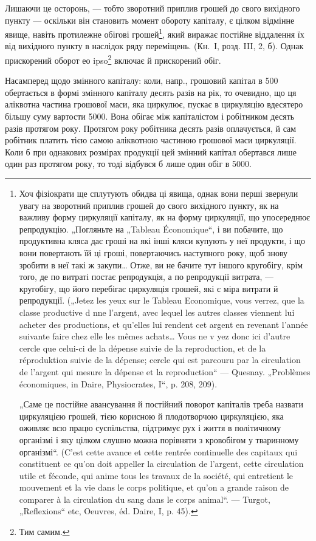 Лишаючи це осторонь,  — тобто зворотний приплив
грошей до свого вихідного пункту — оскільки він становить момент
обороту капіталу, є цілком відмінне явище, навіть протилежне обігові
грошей\footnote{
Хоч фізіократи ще сплутують обидва ці явища, однак вони перші звернули
увагу на зворотний приплив грошей до свого вихідного пункту, як на важливу
форму циркуляції капіталу, як на форму циркуляції, що упосереднює репродукцію.
„Погляньте на „Tableau Économique“, і ви побачите, що продуктивна кляса дає
гроші на які інші кляси купують у неї продукти, і що вони повертають їй ці
гроші, повертаючись наступного року, щоб знову зробити в неї такі ж закупи\dots{}
Отже, ви не бачите тут іншого кругобігу, крім того, де по витраті
постає репродукція, а по репродукції витрата, — кругобігу, що його перебігає
циркуляція грошей, які є міра витрати й репродукції. („Jetez les yeux sur le
Tableau Economique, vous verrez, que la classe productive d nne l’argent,
avec lequel les autres classes viennent lui acheter des productions, et qu’elles lui
rendent cet argent en revenant l’année suivante faire chez elle les mêmes achats\dots{}
Vous ne v yez donc ici d’autre cercle que celui-ci de la dépense suivie de la reproduction,
et de la réproduktion suivie de la dépense; cercle qui est parcouru par la
circulation de l’argent qui mesure la dépense et la reproduction“ — Quesnay. „Problèmes
économiques, in Daire, Physiocrates, I“, p. 208, 209).

„Саме це постійне авансування й постійний поворот капіталів треба назвати
циркуляцією грошей, тією корисною й плодотворчою циркуляцією, яка оживляє
всю працю суспільства, підтримує рух і життя в політичному організмі і яку
цілком слушно можна порівняти з кровобігом у тваринному організмі“. (C’est
cette avance et cette rentrée continuelle des capitaux qui constituent ce qu’on doit
appeller la circulation de l’argent, cette circulation utile et féconde, qui anime tous
les travaux de la société, qui entretient le mouvement et la vie dans le corps politique,
et qu’on a grande raison de comparer à la circulation du sang dans le corps animal“.
— Turgot, „Reflexions“ etc, Oeuvres, éd. Daire, I, p. 45).}, який виражає постійне віддалення їх від вихідного
пункту в наслідок ряду переміщень. (Кн.~І, розд. III, 2, б). Однак прискорений
оборот ео ipso\footnote*{
Тим самим. 
} включає й прискорений обіг.

Насамперед щодо змінного капіталу: коли, напр., грошовий капітал
в 500 обертається в формі змінного капіталу десять разів на
рік, то очевидно, що ця аліквотна частина грошової маси, яка циркулює,
пускає в циркуляцію вдесятеро більшу суму вартости \deq{} 5000.
Вона обігає між капіталістом і робітником десять разів протягом року.
Протягом року робітника десять разів оплачується, й сам робітник платить
тією самою аліквотною частиною грошової маси циркуляції. Коли
б при однакових розмірах продукції цей змінний капітал обертався
лише один раз протягом року, то тоді відбувся б лише один обіг
в 5000.

